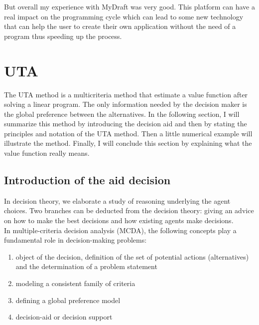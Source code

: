 \documentclass{report}
\begin{document}
But overall my experience with MyDraft was very good. This platform can have a real impact on the programming cycle which can lead to some new technology that can help the user to create their own application without the need of a program thus speeding up the process.

\section{UTA}
The UTA method is a multicriteria method that estimate a value function after solving a linear program. The only information needed by the decision maker is the global preference between the alternatives. In the following section, I will summarize this method by introducing the decision aid and then by stating the principles and notation of the UTA method. Then a little numerical example will illustrate the method. Finally, I will conclude this section by explaining what the value function really means.\\

\subsection{Introduction of the aid decision}
In decision theory, we elaborate a study of reasoning underlying the agent choices. Two branches can be deducted from the decision theory: giving an advice on how to make the best decisions and how existing agents make decisions. \\
In multiple-criteria decision analysis (MCDA), the following concepts play a fundamental role in decision-making problems: 
\begin{enumerate}
\item object of the decision, definition of the set of potential actions (alternatives) and the determination of a problem statement
\item modeling a consistent family of criteria
\item defining a global preference model
\item decision-aid or decision support
\end{enumerate}
\end{document}

